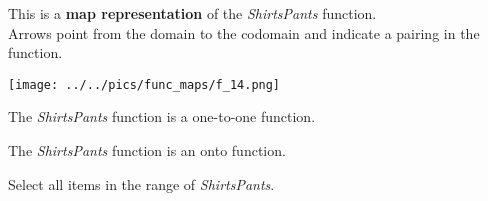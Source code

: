 \documentclass{ximera}
\author{Lee Wayand}
\begin{document}
\begin{exercise}

This is a \textbf{map representation} of the \textit{ShirtsPants} function. \\


Arrows point from the domain to the codomain and indicate a pairing in the function.


\begin{image}
\texttt{[image: ../../pics/func\_maps/f\_14.png]}
\end{image}




\begin{question} 
The \textit{ShirtsPants} function is a one-to-one function.

\begin{multipleChoice}
\end{multipleChoice}
\end{question}







\begin{question} 
The \textit{ShirtsPants} function is an onto function.

\begin{multipleChoice}
\end{multipleChoice}
\end{question}







\begin{question} 

Select all items in the range of \textit{ShirtsPants}.

\begin{selectAll}
\end{selectAll}
\end{question}












\end{exercise}
\end{document}
